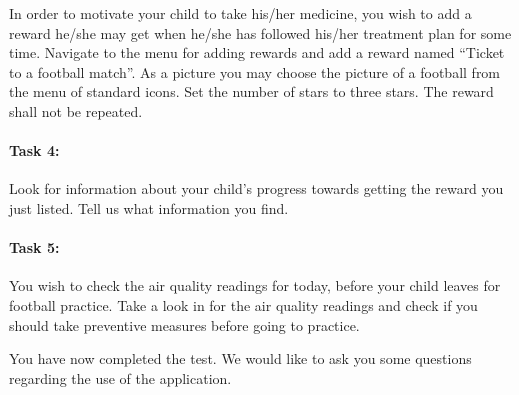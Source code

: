 In order to motivate your child to take his/her medicine, you wish to add a reward he/she may get when he/she has followed his/her treatment plan for some time. 
Navigate to the menu for adding rewards and add a reward named ``Ticket to a football match''. As a picture you may choose the picture of a football from the menu of standard icons. Set the number of stars to three stars. The reward shall not be repeated. 


\paragraph{Task 4:}

Look for information about your child's progress towards getting the reward you just listed. Tell us what information you find.

\paragraph{Task 5:}

You wish to check the air quality readings for today, before your child leaves for football practice. Take a look in for the air quality readings and check if you should take preventive measures before going to practice.  

You have now completed the test. We would like to ask you some questions regarding the use of the application. 

